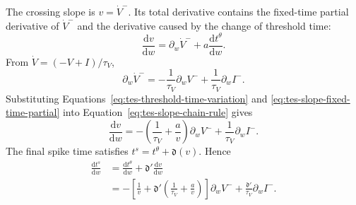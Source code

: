 The crossing slope is $v=\dot V^-$. Its total derivative contains the
fixed-time partial derivative of $\dot V^-$ and the derivative caused by the change of threshold time:
\begin{equation}
    \frac{\mathrm dv}{\mathrm dw}
      =\partial_w\dot V^-
       +a\frac{\mathrm dt^\theta}{\mathrm dw}.
    \label{eq:tes-slope-chain-rule}
\end{equation}
From $\dot V=(-V+I)/\tau_V$,
\begin{equation}
    \partial_w\dot V^-
      =-\frac{1}{\tau_V}\partial_wV^-
       +\frac{1}{\tau_V}\partial_wI^-.
    \label{eq:tes-slope-fixed-time-partial}
\end{equation}
Substituting Equations~\eqref{eq:tes-threshold-time-variation} and
\eqref{eq:tes-slope-fixed-time-partial} into
Equation~\eqref{eq:tes-slope-chain-rule} gives
\begin{equation}
    \frac{\mathrm dv}{\mathrm dw}
      =-\left(\frac{1}{\tau_V}+\frac{a}{v}\right)\partial_wV^-
       +\frac{1}{\tau_V}\partial_wI^-.
    \label{eq:tes-slope-variation}
\end{equation}
The final spike time satisfies $t^s=t^\theta+\mathfrak d(v)$. Hence
\begin{align}
    \frac{\mathrm dt^s}{\mathrm dw}
      &=\frac{\mathrm dt^\theta}{\mathrm dw}
        +\mathfrak d'\frac{\mathrm dv}{\mathrm dw}
        \nonumber\\
      &=-\left[
          \frac{1}{v}
          +\mathfrak d'
           \left(\frac{1}{\tau_V}+\frac{a}{v}\right)
        \right]\partial_wV^-
       +\frac{\mathfrak d'}{\tau_V}\partial_wI^-.
    \label{eq:tes-final-time-variation}
\end{align}

